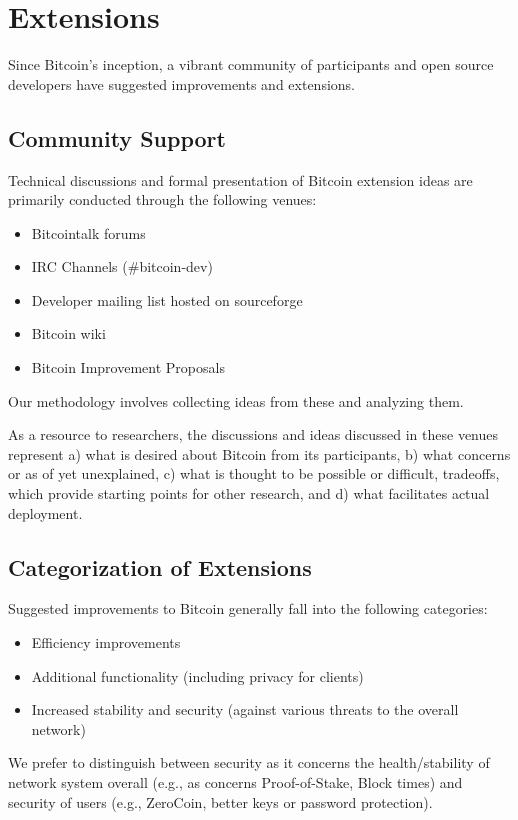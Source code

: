 \section{Extensions}

Since Bitcoin's inception, a vibrant community of participants and open source developers have suggested improvements and extensions.

\subsection{Community Support}
Technical discussions and formal presentation of Bitcoin extension ideas are primarily conducted through the following venues:
\begin{itemize}
\item Bitcointalk forums
\item IRC Channels (#bitcoin-dev)
\item Developer mailing list hosted on sourceforge
\item Bitcoin wiki
\item Bitcoin Improvement Proposals
\end{itemize}

Our methodology involves collecting ideas from these and analyzing them.

As a resource to researchers, the discussions and ideas discussed in these venues represent a) what is desired about Bitcoin from its participants, b) what concerns or as of yet unexplained, c) what is thought to be possible or difficult, tradeoffs, which provide starting points for other research, and d) what facilitates actual deployment.

\subsection{Categorization of Extensions}

Suggested improvements to Bitcoin generally fall into the following categories:
\begin{itemize}
\item Efficiency improvements
\item Additional functionality (including privacy for clients)
\item Increased stability and security (against various threats to the overall network)
\end{itemize}

We prefer to distinguish between security as it concerns the health/stability of network system overall (e.g., as concerns Proof-of-Stake, Block times) and security of users (e.g., ZeroCoin, better keys or password protection).

